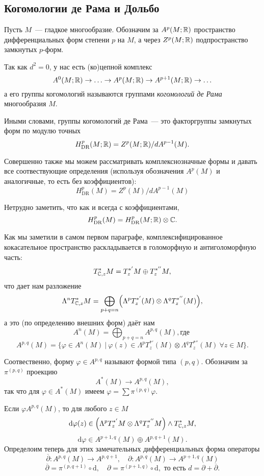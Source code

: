    \subsection{Когомологии де Рама и Дольбо}

    Пусть $M$~--- гладкое многообразие. Обозначим за $A^{p}(M; \R)$
    пространство дифференциальных форм степени $p$ на $M$, а через $Z^{p}(M; \R)$
    подпространство замкнутых $p$-форм.

    Так как $d^2 = 0$, у нас есть (ко)цепной комплекс
    \[ A^{0}(M; \R) \to \ldots \to A^{p}(M; \R) \to A^{p + 1}(M; \R) \to \ldots \]
    а его группы когомологий называются группами \emph{когомологий де Рама} многообразия $M$.

    Иными словами, группы когомологий де Рама~--- это факторгруппы замкнутых форм по модулю точных
    \[ H_{\textrm{DR}}^{p}(M; \R)  = Z^{p}(M; \R) / d A^{p - 1}(M). \]

    Совершенно также мы можем рассматривать комплекснозначные формы и давать все соотвествующие определения (используя обозначения $ A^{p}(M)$ и аналогичные, то
    есть без коэффициентов):
    \[ H_{\mathrm{DR}}^{p}(M) = Z^{p}(M)/d A^{p - 1}(M) \]

    \begin{remark}
       Нетрудно заметить, что как и всегда с коэффициентами,
        \[ H^{p}_{\mathrm{DR}}(M) = H_{\mathrm{DR}}^{p}(M; \R) \otimes \C. \]
    \end{remark}

    Как мы заметили в самом первом параграфе, комплексифицированное кокасательное пространство раскладывается в голоморфную и антиголоморфную часть:
    \[ T^{*}_{\C, z}M = T_{z}^{*'} M \oplus T_{z}^{*''} M,  \]
    что дает нам разложение
    \[ \Lambda^n T^{*}_{\C, z}M = \bigoplus_{p + q = n}\lr*{ \Lambda^{p} T^{*'}_{z}(M) \otimes \Lambda^{q} T_{z}^{*''}(M)}, \]
    а это (по определению внешних форм) даёт нам
    \[ A^{n}(M) = \bigoplus_{p + q = n} A^{p, q}(M), \text{где }\]
    \[ A^{p, q}(M) = \{ \varphi \in A^{n}(M) \ \vert \ \varphi(z) \in \Lambda^{p}T_{z}^{*'}(M) \otimes \Lambda^q T_{z}^{*''}(M) \ \forall z \in M \}. \]

    Соотвественно, форму $\varphi \in A^{p, q}$ называют формой типа $(p, q)$. Обозначим за $\pi^{(p, q)}$ проекцию
    \[ A^{*}(M) \to A^{p, q}(M), \]
    так что для $\varphi \in A^{*}(M)$ имеем $\varphi = \sum \pi^{(p, q)}\varphi$.

    Если $\varphi A^{p, q}(M)$, то для любого $z \in M$
    \[ \mathrm{d}\varphi(z) \in \lr*{\Lambda^{p} T_{z}^{*'}M \otimes \Lambda^{q} T^{*''}_{z}M} \wedge T^{*}_{\C, z}M, \]
    \[ \mathrm{d}\varphi \in A^{p + 1, q}(M) \oplus A^{p, q + 1}(M). \]
    Определоим теперь для этих замечательных дифференциальных форма операторы
    \[ \overline{\partial}\colon A^{p, q}(M) \to A^{p, q + 1}, \quad \partial \colon A^{p, q}(M) \to A^{p + 1, q}(M) \]
    \[ \overline{\partial} = \pi^{(p, q + 1)} \circ \mathrm{d}, \quad \partial = \pi^{(p + 1, q)} \circ \mathrm{d}, \text{ то есть } d = \partial + \overline{\partial}. \]

